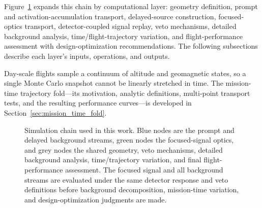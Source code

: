 \documentclass[11pt]{article}
\begin{document}
Figure~\ref{fig:workflow} expands this chain by computational layer: geometry definition, prompt and activation-accumulation transport, delayed-source construction, focused-optics transport, detector-coupled signal replay, veto mechanisms, detailed background analysis, time/flight-trajectory variation, and flight-performance assessment with design-optimization recommendations. The following subsections describe each layer's inputs, operations, and outputs.

Day-scale flights sample a continuum of altitude and geomagnetic states, so a single Monte Carlo snapshot cannot be linearly stretched in time. The mission-time trajectory fold---its motivation, analytic definitions, multi-point transport tests, and the resulting performance curves---is developed in Section~\ref{sec:mission_time_fold}.

\begin{figure}[t]
\centering
{}
\caption{Simulation chain used in this work. Blue nodes are the prompt and
delayed background streams, green nodes the focused-signal optics, and grey
nodes the shared geometry, veto mechanisms, detailed background analysis,
time/trajectory variation, and final flight-performance assessment. The focused
signal and all background streams are evaluated under the same detector response
and veto definitions before background decomposition, mission-time variation,
and design-optimization judgments are made.}
\label{fig:workflow}
\end{figure}
\end{document}
